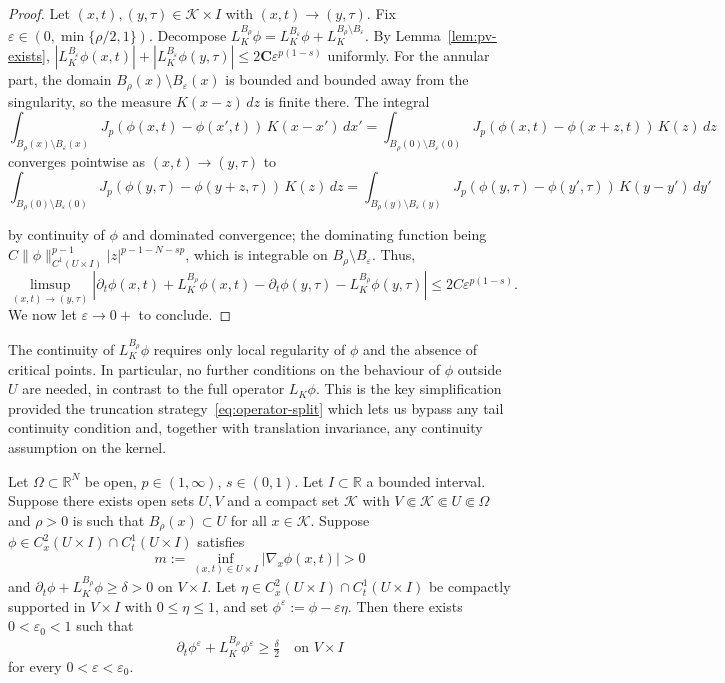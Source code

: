 \documentclass[11pt, a4paper, twoside]{article}
\theoremstyle{definition}
\theoremstyle{remark}
\newcommand{\R}{\mathbb{R}}
\begin{document}
\begin{proof}
Let $(x,t),(y,\tau) \in \mathcal{K} \times I$ with
$(x,t) \to (y,\tau)$. Fix
$\varepsilon \in (0, \min\{\rho/2, 1\})$.
Decompose
$L_K^{B_\rho}\phi
= L_K^{B_\varepsilon}\phi
+ L_K^{B_\rho \setminus B_\varepsilon}$.
By Lemma~\ref{lem:pv-exists},
$|L_K^{B_\varepsilon}\phi(x,t)|+|L_K^{B_\varepsilon}\phi(y,\tau)|
\le 2\mathbf{C}\varepsilon^{p(1-s)}$
uniformly. For the annular part, the domain
$B_\rho(x) \setminus B_\varepsilon(x)$ is bounded and
bounded away from the singularity, so the measure
$K(x-z)\,dz$ is finite there. The integral 
\[
\int_{B_\rho(x)\setminus B_{\varepsilon}(x)}
     J_p(\phi(x,t)-\phi(x',t))\,K(x-x')\,dx' = \int_{B_\rho(0)\setminus B_{\varepsilon}(0)}
     J_p(\phi(x,t)-\phi(x+z,t))\,K(z)\,dz
\]
converges
pointwise as $(x,t) \to (y,\tau)$ to
\[
 \int_{B_\rho(0)\setminus B_{\varepsilon}(0)}
     J_p(\phi(y,\tau)-\phi(y+z,\tau))\,K(z)\,dz = \int_{B_\rho(y)\setminus B_{\varepsilon}(y)}
     J_p(\phi(y,\tau)-\phi(y',\tau))\,K(y-y')\,dy'
\]

by continuity of
$\phi$ and dominated convergence; the dominating function being
$C\|\phi\|_{C^1(U \times I)}^{p-1}
|z|^{p-1-N-sp}$,
which is integrable on $B_\rho \setminus B_\varepsilon$. Thus,
\[
\limsup_{(x,t)\to(y,\tau)} |\partial_t\phi(x,t) + L_K^{B_\rho}\phi(x,t) - \partial_t\phi(y,\tau) - L_K^{B_\rho}\phi(y,\tau)| \le 2C\varepsilon^{p(1-s)}.
\]
We now let $\varepsilon \to0+$ to conclude.
\end{proof}

\begin{remark}
  The continuity of $L_K^{B_\rho}\phi$ requires only local
  regularity of $\phi$ and the absence of critical points. In particular, no further conditions on the
  behaviour of $\phi$ outside $U$ are needed, in contrast
  to the full operator $L_K\phi$. This is the key
  simplification provided the truncation
  strategy~\eqref{eq:operator-split} which lets us bypass any tail continuity condition and, together with translation invariance, any continuity assumption on the kernel. 
\end{remark}

\begin{lemma}\label{lem:parabolic-perturb-down}
Let $\Omega \subset \R^N$ be open, $p \in (1,\infty)$,
$s \in (0,1)$. Let $I \subset \R$ a bounded interval. Suppose there exists
open sets $U,V$ and a compact set $\mathcal{K} $ with $V \Subset \mathcal{K} \Subset U \Subset \Omega$ and $\rho > 0$ is such that
$B_\rho(x) \subset U$ for all $x \in \mathcal{K}$.
Suppose
$\phi \in C^2_x(U \times I) \cap C^1_t(U \times I)$
satisfies
\[
  m := \inf_{(x,t) \in U \times I}|\nabla_x\phi(x,t)|
  > 0
\]
and $\partial_t\phi + L_K^{B_\rho}\phi \ge \delta > 0$
on $V \times I$. Let $\eta \in C^2_x(U \times I) \cap C^1_t(U \times I)$ be
compactly supported in $V \times I$ with $0 \le \eta \le 1$,
and set $\phi^\varepsilon := \phi - \varepsilon\eta$. Then
there exists $0<\varepsilon_0 <1$ such that
\[
  \partial_t\phi^\varepsilon
  + L_K^{B_\rho}\phi^\varepsilon \ge \tfrac{\delta}{2}
  \quad \text{on } V \times I
\]
for every $0 < \varepsilon < \varepsilon_0$.
\end{lemma}
\end{document}
